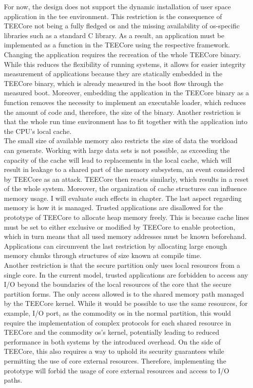 For now, the design does not support the dynamic installation of user space
application in the \gls{tee} environment. This restriction is the consequence of
TEECore not being a fully fledged \gls{os} and the missing availability of
\gls{os}-specific libraries such as a standard C library. As a result, an
application must be implemented as a function in the TEECore using the
respective framework. Changing the application requires the recreation of the
whole TEECore binary. While this reduces the flexibility of running systems, it
allows for easier integrity measurement of applications because they are
statically embedded in the TEECore binary, which is already measured in the boot
flow through the measured boot. Moreover, embedding the application in the
TEECore binary as a function removes the necessity to implement an executable
loader, which reduces the amount of code and, therefore, the size of the binary.
Another restriction is that the whole run time environment has to fit together
with the application into the CPU's local cache.\\

The small size of available memory also restricts the size of data the workload
can generate. Working with large data sets is not possible, as exceeding the
capacity of the cache will lead to replacements in the local cache, which will
result in leakage to a shared part of the memory subsystem, an event considered
by TEECore as an attack. TEECore then reacts similarly, which results in a reset
of the whole system. Moreover, the organization of cache structures can
influence memory usage. I will evaluate such effects in chapter. The last aspect regarding memory is how it is managed.
Trusted applications are disallowed for the prototype of TEECore to allocate
heap memory freely. This is because cache lines must be set to either exclusive
or modified by TEECore to enable protection, which in turn means that all used
memory addresses must be known beforehand. Applications can circumvent the last
restriction by allocating large enough memory chunks through structures of size
known at compile time.\\

Another restriction is that the secure partition only uses local resources from
a single core. In the current model, trusted applications are forbidden to
access any I/O beyond the boundaries of the local resources of the core that the
secure partition forms. The only access allowed is to the shared memory path
managed by the TEECore kernel. While it would be possible to use the same
resources, for example, I/O port, as the commodity \gls{os} in the normal
partition, this would require the implementation of complex protocols for each
shared resource in TEECore and the commodity \gls{os}'s kernel, potentially
leading to reduced performance in both systems by the introduced overhead. On
the side of TEECore, this also requires a way to uphold its security guarantees
while permitting the use of core external resources. Therefore, implementing the
prototype will forbid the usage of core external resources and access to I/O
paths.

